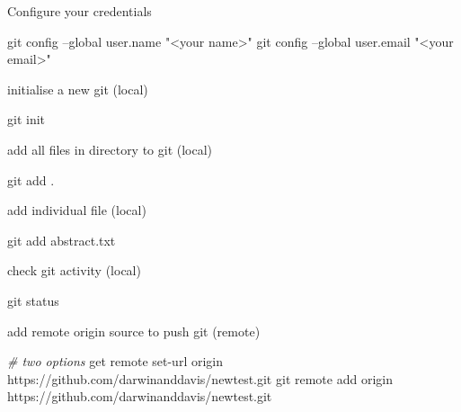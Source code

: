 \documentclass[10,portrait]{article}
\newenvironment{Shaded}{\begin{snugshade}}{\end{snugshade}}
\newcommand{\StringTok}[1]{\textcolor[rgb]{0.31,0.60,0.02}{#1}}
\newcommand{\CommentTok}[1]{\textcolor[rgb]{0.56,0.35,0.01}{\textit{#1}}}
\newcommand{\FunctionTok}[1]{\textcolor[rgb]{0.00,0.00,0.00}{#1}}
\newcommand{\ExtensionTok}[1]{#1}
\newcommand{\NormalTok}[1]{#1}
\begin{document}
Configure your credentials

\begin{Shaded}
\begin{Highlighting}[]
\FunctionTok{git}\NormalTok{ config --global user.name }\StringTok{"<your name>"}
\FunctionTok{git}\NormalTok{ config --global user.email }\StringTok{"<your email>"}  
\end{Highlighting}
\end{Shaded}

initialise a new git (local)

\begin{Shaded}
\begin{Highlighting}[]
\FunctionTok{git}\NormalTok{ init  }
\end{Highlighting}
\end{Shaded}

add all files in directory to git (local)

\begin{Shaded}
\begin{Highlighting}[]
\FunctionTok{git}\NormalTok{ add .}
\end{Highlighting}
\end{Shaded}

add individual file (local)

\begin{Shaded}
\begin{Highlighting}[]
\FunctionTok{git}\NormalTok{ add abstract.txt}
\end{Highlighting}
\end{Shaded}

check git activity (local)

\begin{Shaded}
\begin{Highlighting}[]
\FunctionTok{git}\NormalTok{ status }
\end{Highlighting}
\end{Shaded}

add remote origin source to push git (remote)

\begin{Shaded}
\begin{Highlighting}[]
\CommentTok{# two options  }
\ExtensionTok{get}\NormalTok{ remote set-url origin https://github.com/darwinanddavis/newtest.git  }
\FunctionTok{git}\NormalTok{ remote add origin https://github.com/darwinanddavis/newtest.git}
\end{Highlighting}
\end{Shaded}
\end{document}
